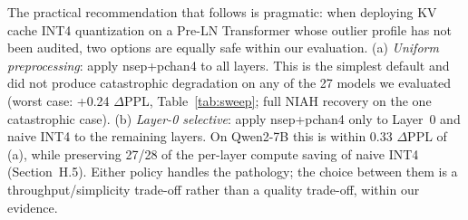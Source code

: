 \documentclass[11pt]{article}
\begin{document}
The practical recommendation that follows is pragmatic: when deploying KV cache INT4 quantization on a Pre-LN Transformer whose outlier profile has not been audited, two options are equally safe within our evaluation. (a) \emph{Uniform preprocessing}: apply nsep+pchan4 to all layers. This is the simplest default and did not produce catastrophic degradation on any of the 27 models we evaluated (worst case: +0.24 $\Delta$PPL, Table~\ref{tab:sweep}; full NIAH recovery on the one catastrophic case). (b) \emph{Layer-0 selective}: apply nsep+pchan4 only to Layer~0 and naive INT4 to the remaining layers. On Qwen2-7B this is within 0.33 $\Delta$PPL of (a), while preserving 27/28 of the per-layer compute saving of naive INT4 (Section~H.5). Either policy handles the pathology; the choice between them is a throughput/simplicity trade-off rather than a quality trade-off, within our evidence.
\end{document}
